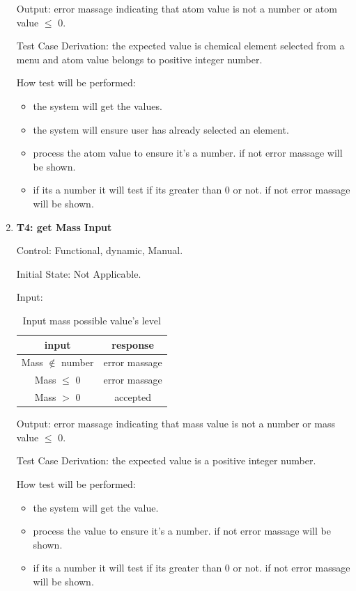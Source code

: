 \documentclass[12pt, titlepage]{article}
\begin{document}
\begin{enumerate}
Output: error massage indicating that atom value is not a number or atom value $\leq$ 0. 

Test Case Derivation: the expected value is chemical element selected from a menu and atom value belongs to positive integer number. 

How test will be performed: 
\begin{itemize}
\item the system will get the values. 
\item the system will ensure user has already selected an element. 
\item process the atom value to ensure it's a number. if not error massage will be shown.
\item if its a number it will test if its greater than 0 or not.  if not error massage will be shown.
\end{itemize}

\item{\bf T4: get Mass Input \\}

Control: Functional, dynamic, Manual.
					
Initial State: Not Applicable.
					
Input: 
\begin{table}[h!]
\centering
\begin{tabular}{|c|c|}
\hline
input & response  \\
\hline
Mass $\notin$ number  & error massage \\ \hline
Mass $\leq$ 0& error massage \\ \hline
Mass $>$ 0  & accepted\\ \hline
\hline
\end{tabular}
\caption{Input mass possible value's level }
\label{mass}
\end{table}

Output: error massage indicating that mass value is not a number or mass value $\leq$ 0. 

Test Case Derivation: the expected value is a positive integer number. 
					
How test will be performed: 
\begin{itemize}
\item the system will get the value. 
\item process the value to ensure it's a number. if not error massage will be shown.
\item if its a number it will test if its greater than 0 or not.  if not error massage will be shown.
\end{itemize}


\end{enumerate}
\end{document}
